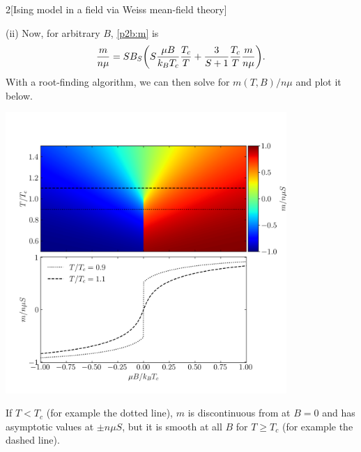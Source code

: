 \documentclass[12pt]{article}
\begin{document}
\begin{problem}{2}[Ising model in a field via Weiss mean-field theory]
\begin{solution}
(ii) Now, for arbitrary $B$, \eqref{p2b:m} is
\begin{equation}\label{p2c:m}
    \frac{m}{n\mu}=SB_S\qty(S\frac{\mu
    B}{k_BT_c}\frac{T_c}{T}+\frac{3}{S+1}\frac{T_c}{T}\frac{m}{n\mu}). 
\end{equation}
With a root-finding algorithm, we can then solve for $m(T,B)/n\mu$ and plot it
below.
\begin{center}
    \includegraphics[width=0.8\textwidth]{p2cii.png} 
\end{center}
If $T<T_c$ (for example the dotted line), $m$ is discontinuous from at $B=0$ and
has asymptotic values at $\pm n\mu S$, but it is smooth at all $B$ for $T\geq
T_c$ (for example the dashed line).
\end{solution}


\end{problem}
\end{document}
